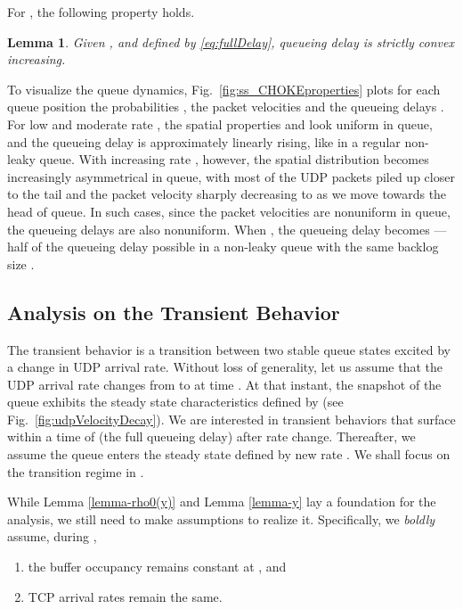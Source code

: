 \documentclass{IEEEtran}
\newtheorem{lemma}{Lemma}
\begin{document}
For , the following property holds.
    \begin{lemma}\label{eq:lemmaTauY}
        Given ,  and  defined by \eqref{eq:fullDelay},  queueing delay  is strictly convex increasing.
    \end{lemma}

        To visualize the queue dynamics, Fig.~\ref{fig:ss_CHOKEproperties} plots for each queue position  the probabilities , the packet velocities   and the queueing delays . For low and moderate rate , the spatial properties   and  look uniform in queue, and the queueing delay  is approximately linearly rising, like in a regular non-leaky queue. With increasing rate , however, the spatial distribution becomes increasingly asymmetrical in queue, with most of the UDP packets piled up closer to the tail and the packet velocity sharply decreasing to  as we move towards the head of queue. In such cases, since the packet velocities are nonuniform in queue, the queueing delays are also nonuniform. When ,  the queueing delay becomes ---half of the queueing delay possible in a non-leaky queue with the same backlog size .

    \subsection{Analysis on the Transient Behavior}\label{subsec:transient}
The transient behavior is a transition between two stable queue states excited by a change in UDP arrival rate. Without loss of generality, let us assume that the UDP arrival rate changes from  to  at time . At that instant, the snapshot of the queue exhibits the steady state characteristics defined by  (see Fig.~\ref{fig:udpVelocityDecay}). We are interested in transient behaviors that surface within a time of  (the full queueing delay) after rate change. Thereafter, we assume the queue enters the steady state defined by new rate . We shall focus on the transition regime in .

While Lemma \ref{lemma-rho0(y)} and Lemma \ref{lemma-y} lay a foundation for the analysis, we still need to make assumptions to realize it. Specifically, we {\em boldly} assume, during ,
\begin{enumerate}[I: ]
\item the buffer occupancy remains constant at , and \label{tran:AI}
        \item TCP arrival rates remain the same.   \label{tran:AII}
    \end{enumerate}
\end{document}
